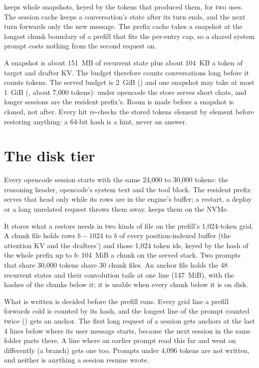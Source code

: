  keeps whole snapshots, keyed by the tokens that produced them, for two uses. The session cache keeps a conversation's state after its turn ends, and the next turn forwards only the new message. The prefix cache takes a snapshot at the longest chunk boundary of a prefill that fits the per-entry cap, so a shared system prompt costs nothing from the second request on.

A snapshot is about 151~MB of recurrent state plus about 104~KB a token of target and drafter KV. The budget therefore counts conversations long before it counts tokens. The served budget is 2~GiB () and one snapshot may take at most 1~GiB (, about 7,000 tokens): under opencode the store serves short chats, and longer sessions are the resident prefix's. Room is made before a snapshot is cloned, not after. Every hit re-checks the stored tokens element by element before restoring anything: a 64-bit hash is a hint, never an answer.

\section{The disk tier}\label{sec:disk-tier}

Every opencode session starts with the same 24,000 to 30,000 tokens: the reasoning header, opencode's system text and the tool block. The resident prefix serves that head only while its rows are in the engine's buffer; a restart, a deploy or a long unrelated request throws them away.  keeps them on the NVMe.

It stores what a restore needs in two kinds of file on the prefill's 1,024-token grid. A chunk file holds rows $b - 1024$ to $b$ of every position-indexed buffer (the attention KV and the drafters') and those 1,024 token ids, keyed by the hash of the whole prefix up to $b$: 104~MiB a chunk on the served stack. Two prompts that share 30,000 tokens share 30 chunk files. An anchor file holds the 48 recurrent states and their convolution tails at one line (147~MiB), with the hashes of the chunks below it; it is usable when every chunk below it is on disk.

What is written is decided before the prefill runs. Every grid line a prefill forwards cold is counted by its hash, and the longest line of the prompt counted twice () gets an anchor. The first long request of a session gets anchors at the last 4 lines below where its user message starts, because the next session in the same folder parts there. A line where an earlier prompt read this far and went on differently (a branch) gets one too. Prompts under 4,096 tokens are not written, and neither is anything a session resume wrote.

